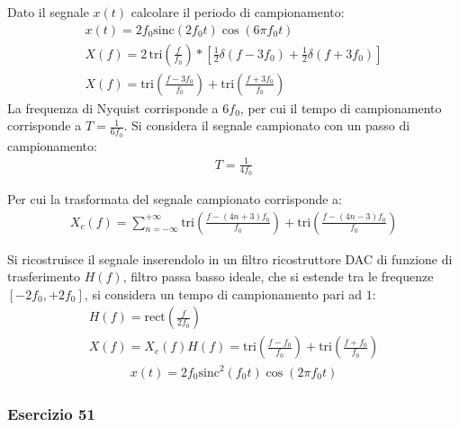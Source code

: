 \documentclass{article}
\newcommand{\rect}{\mathrm{rect}}
\newcommand{\sinc}{\mathrm{sinc}}
\newcommand{\tri}{\mathrm{tri}}
\begin{document}
Dato il segnale $x(t)$ calcolare il periodo di campionamento:
\begin{gather*}
    x(t)=2f_0\sinc(2f_0t)\cos(6\pi f_0t)\\
    X(f)=\displaystyle2\,\tri \left(\frac{f}{f_0}\right)*\left[\frac{1}{2}\delta\left(f-3f_0\right)+\frac{1}{2}\delta(f+3f_0)\right]\\
    X(f)=\displaystyle\tri \left(\frac{f-3f_0}{f_0}\right)+\tri \left(\frac{f+3f_0}{f_0}\right)
\end{gather*}
La frequenza di Nyquist corrisponde a $6f_0$, per cui il tempo di campionamento corrisponde a $T=\displaystyle\frac{1}{6f_0}$. Si considera il segnale campionato con un 
passo di campionamento:
\begin{gather*}
    T=\displaystyle\frac{1}{4f_0}
\end{gather*}

Per cui la trasformata del segnale campionato corrisponde a:
\begin{gather*}
    X_c(f)=\displaystyle\sum_{n=-\infty}^{+\infty}\tri \left(\frac{f-(4n+3)f_0}{f_0}\right)+\tri \left(\frac{f-(4n-3)f_0}{f_0}\right)
\end{gather*}

Si ricostruisce il segnale inserendolo in un filtro ricostruttore DAC di funzione di trasferimento $H(f)$, filtro passa basso ideale, che si estende tra le 
frequenze $[-2f_0,+2f_0]$, si considera un tempo di campionamento pari ad $1$:
\begin{gather*}
    H(f)=\displaystyle\rect\left(\frac{f}{2f_0}\right)\\
    X(f)=X_c(f)H(f)=\displaystyle\tri \left(\frac{f-f_0}{f_0}\right)+\tri \left(\frac{f+f_0}{f_0}\right)
\end{gather*}
\begin{gather}
    x(t)=2f_0\sinc^2(f_0t)\cos(2\pi f_0t)
\end{gather} 

\subsubsection*{Esercizio 51}
\end{document}
